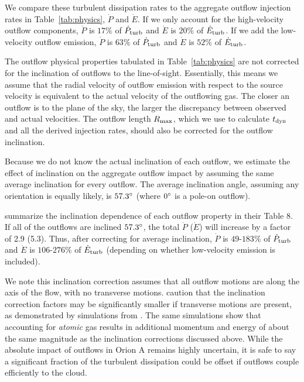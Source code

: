 \documentclass[twocolumn]{aastex63}
\begin{document}
We compare these turbulent dissipation rates to the aggregate outflow injection rates in Table~\ref{tab:physics}, $\dot P$ and $\dot E$. If we only account for the high-velocity outflow components, $\dot P$ is $17\%$ of $\dot P_{\rm turb}$ and $\dot E$ is $20\%$ of $\dot E_{\rm turb}$. If we add the low-velocity outflow emission, $\dot P$ is $63\%$ of $\dot P_{\rm turb}$ and $\dot E$ is $52\%$ of $\dot E_{\rm turb}$.

The outflow physical properties tabulated in Table~\ref{tab:physics} are not corrected for the inclination of outflows to the line-of-sight. Essentially, this means we assume that the radial velocity of outflow emission with respect to the source velocity is equivalent to the actual velocity of the outflowing gas. The closer an outflow is to the plane of the sky, the larger the discrepancy between observed and actual velocities. The outflow length $R_{\rm max}$, which we use to calculate $t_{\rm dyn}$ and all the derived injection rates, should also be corrected for the outflow inclination.

Because we do not know the actual inclination of each outflow, we estimate the effect of inclination on the aggregate outflow impact by assuming the same average inclination for every outflow. The average inclination angle, assuming any orientation is equally likely, is $57.3\mbox{$^\circ$}$ (where $0\mbox{$^\circ$}$ is a pole-on outflow).


\citet{Dunham14} summarize the inclination dependence of each outflow property in their Table 8. If all of the outflows are inclined $57.3\mbox{$^\circ$}$, the total $\dot P$ ($\dot E$) will increase by a factor of 2.9 (5.3). Thus, after correcting for average inclination, $\dot P$ is  $49$-$183\%$ of $\dot P_{\rm turb}$ and $\dot E$ is $106$-$276\%$ of $\dot E_{\rm turb}$ (depending on whether low-velocity emission is included).

We note this inclination correction assumes that all outflow motions are along the axis of the flow, with no transverse motions. \citet{Dunham14} caution that the inclination correction factors may be significantly smaller if transverse motions are present, as demonstrated by simulations from \citet{Downes07}. The same simulations show that accounting for \emph{atomic} gas results in additional momentum and energy of about the same magnitude as the inclination corrections discussed above. While the absolute impact of outflows in Orion A remains highly uncertain, it is safe to say a significant fraction of the turbulent dissipation could be offset if outflows couple efficiently to the cloud. %
\end{document}
